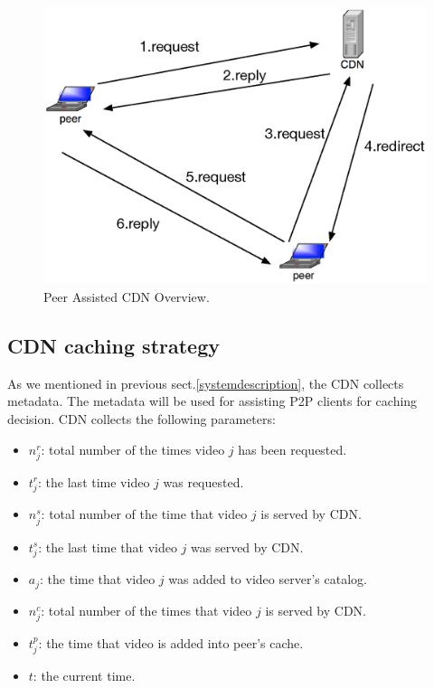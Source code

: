 \documentclass[conference]{IEEEtran}
\begin{document}
\begin{figure}[thb]
\begin{center}
\includegraphics[scale=0.6]{graphs/p2p-system-description.eps}
\end{center}
\caption{Peer Assisted CDN Overview.}
\label{fig:p2pcdnoverview}
\vspace{-2mm}
\end{figure} 


\subsection{CDN caching strategy}\label{cdncachingstrategy}
As we mentioned in previous sect.\ref{systemdescription}, the CDN collects metadata.
The metadata will be used for assisting P2P clients for caching decision. 
CDN collects the following parameters:
\begin{itemize}
\item $n_j^r$: total number of the times video $j$ has been requested.  
\item $t_j^r$: the last time video $j$ was requested.
\item $n_j^s$: total number of the time that video $j$ is served by CDN.
\item $t_j^s$: the last time that video $j$ was served by CDN.
\item $a_j$: the time that video $j$ was added to video server's catalog.
\item $n_j^c$: total number of the times that video $j$ is served by CDN.
\item $t_j^p$: the time that video  is added into peer's cache.
\item $t$: the current time.
\end{itemize}
\end{document}
